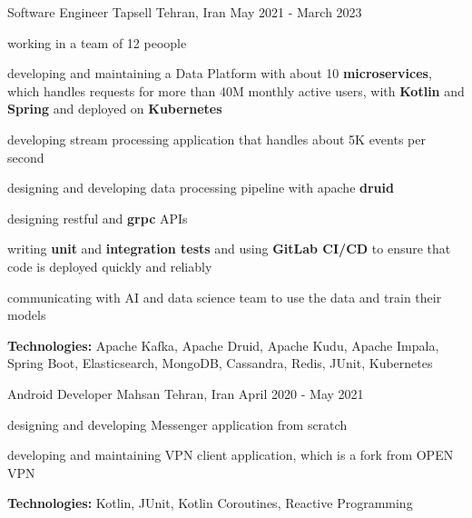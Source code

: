 \begin{cventries}
    \cventry
    {Software Engineer} %
    {Tapsell} %
    {Tehran, Iran} %
    {May 2021 - March 2023} %
    {
      \begin{cvitems} %
        \item working in a team of 12 peoople
        \item developing and maintaining a Data Platform with about 10 \textbf{microservices}, which handles requests for more than 40M monthly active users, with \textbf{Kotlin} and 
        \textbf{Spring} and deployed on \textbf{Kubernetes} 
        \item developing stream processing application that handles about 5K events per second
        \item designing and developing data processing pipeline with apache \textbf{druid}
        \item designing restful and \textbf{grpc} APIs
        \item writing \textbf{unit} and \textbf{integration tests} and using \textbf{GitLab CI/CD} to ensure that code is deployed quickly and reliably
        \item communicating with AI and data science team to use the data and train their models
        \item \textbf{Technologies:} Apache Kafka, Apache Druid, Apache Kudu, Apache Impala, Spring Boot, Elasticsearch, MongoDB, Cassandra, Redis, JUnit, Kubernetes
      \end{cvitems}
    }

    \cventry
    {Android Developer} %
    {Mahsan} %
    {Tehran, Iran} %
    {April 2020 - May 2021} %
    {
      \begin{cvitems} %
        \item designing and developing Messenger application from scratch
        \item developing and maintaining VPN client application, which is a fork from OPEN VPN
        \item \textbf{Technologies:} Kotlin, JUnit, Kotlin Coroutines, Reactive Programming
      \end{cvitems}
    }


\end{cventries}
